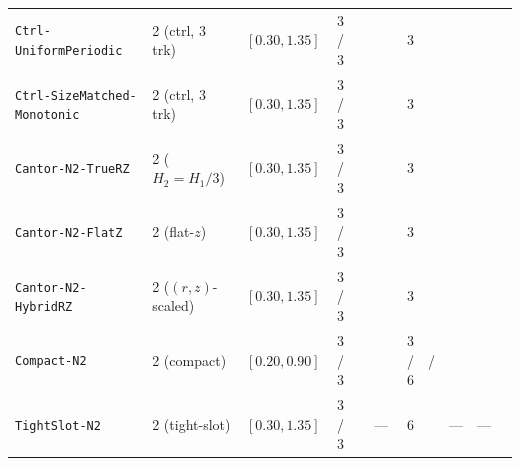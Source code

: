 \begin{table}[!htbp]
{\begin{tabular}{llccccrrrrr}
\texttt{Ctrl-UniformPeriodic} & 2 (ctrl, 3 trk) & $[0.30, 1.35]$ & 3 / 3 & \NatureCtrlUniformperiodicFullToothPlanformAreaUmtwo{} & \NatureCtrlUniformperiodicFullToothPlanformPerimeterUm{} & 3 & \NatureCtrlUniformperiodicFRepPn{} & \NatureCtrlUniformperiodicFRepPnPerToothAreaUmtwo{} & \NatureCtrlUniformperiodicFRepPnPerToothPerimeterUm{} & \NatureCtrlUniformperiodicFAttPn{} \\
\texttt{Ctrl-SizeMatched-Monotonic} & 2 (ctrl, 3 trk) & $[0.30, 1.35]$ & 3 / 3 & \NatureCtrlSizematchedMonotonicFullToothPlanformAreaUmtwo{} & \NatureCtrlSizematchedMonotonicFullToothPlanformPerimeterUm{} & 3 & \NatureCtrlSizematchedMonotonicFRepPn{} & \NatureCtrlSizematchedMonotonicFRepPnPerToothAreaUmtwo{} & \NatureCtrlSizematchedMonotonicFRepPnPerToothPerimeterUm{} & \NatureCtrlSizematchedMonotonicFAttPn{} \\
\texttt{Cantor-N2-TrueRZ} & 2 ($H_2=H_1/3$) & $[0.30, 1.35]$ & 3 / 3 & \NatureCantorNtwoTruerzFullToothPlanformAreaUmtwo{} & \NatureCantorNtwoTruerzFullToothPlanformPerimeterUm{} & 3 & \NatureCantorNtwoTruerzFRepPn{} & \NatureCantorNtwoTruerzFRepPnPerToothAreaUmtwo{} & \NatureCantorNtwoTruerzFRepPnPerToothPerimeterUm{} & \NatureCantorNtwoTruerzFAttPn{} \\
\texttt{Cantor-N2-FlatZ} & 2 (flat-$z$) & $[0.30, 1.35]$ & 3 / 3 & \NatureCantorNtwoFlatzFullToothPlanformAreaUmtwo{} & \NatureCantorNtwoFlatzFullToothPlanformPerimeterUm{} & 3 & \NatureCantorNtwoFlatzFRepPn{} & \NatureCantorNtwoFlatzFRepPnPerToothAreaUmtwo{} & \NatureCantorNtwoFlatzFRepPnPerToothPerimeterUm{} & \NatureCantorNtwoFlatzFAttPn{} \\
\texttt{Cantor-N2-HybridRZ} & 2 ($(r,z)$-scaled) & $[0.30, 1.35]$ & 3 / 3 & \NatureCantorNtwoHybridrzFullToothPlanformAreaUmtwo{} & \NatureCantorNtwoHybridrzFullToothPlanformPerimeterUm{} & 3 & \NatureCantorNtwoHybridrzFRepPn{} & \NatureCantorNtwoHybridrzFRepPnPerToothAreaUmtwo{} & \NatureCantorNtwoHybridrzFRepPnPerToothPerimeterUm{} & \NatureCantorNtwoHybridrzFAttPn{} \\
\texttt{Compact-N2} & 2 (compact) & $[0.20, 0.90]$ & 3 / 3 & \NatureRotCeightCompactNtwoFullToothPlanformAreaUmtwo{} & \NatureRotCeightCompactNtwoFullToothPlanformPerimeterUm{} & 3 / 6 & \NatureRotCeightCompactNtwoFRepPn{} / \RotCeightCompactNtwoStandardThetaZerozerosixpzeroVectorDyadicFZPn{} & \NatureRotCeightCompactNtwoFRepPnPerToothAreaUmtwo{} & \NatureRotCeightCompactNtwoFRepPnPerToothPerimeterUm{} & \NatureRotCeightCompactNtwoFAttPn{} \\
\texttt{TightSlot-N2} & 2 (tight-slot) & $[0.30, 1.35]$ & 3 / 3 & \RotCfourTightslotNtwoHighThetaZerofoureightpzeroPolarOverlapUmtwo{} & --- & 6 & \RotCfourTightslotNtwoStandardThetaZerozerosixpzeroVectorDyadicFZPn{} & --- & --- & \RotCfourTightslotNtwoThetaFoureightStepEightFNetPn{} \\

\end{tabular}}
\end{table}
